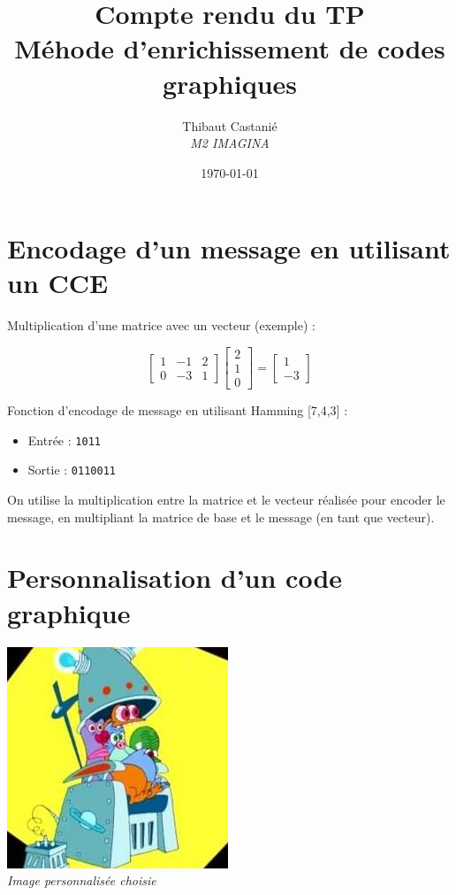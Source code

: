 \documentclass[a4paper,11pt]{article}
\begin{document}
\title{\textbf{Compte rendu du TP }\\Méhode d'enrichissement de codes graphiques}
\author{Thibaut Castanié\\\textit{M2 IMAGINA}}
\date{\today}

\maketitle
\thispagestyle{empty}

\newpage 

\section*{Encodage d'un message en utilisant un CCE}

Multiplication d'une matrice avec un vecteur (exemple) :

\[\begin{bmatrix}1 & -1 & 2\\0&-3&1\end{bmatrix}\begin{bmatrix}2\\1\\0 \end{bmatrix} = \begin{bmatrix}1 \\-3 \end{bmatrix}\]

Fonction d'encodage de message en utilisant Hamming [7,4,3] :

\begin{itemize}
\item Entrée : \texttt{1011}
\item Sortie : \texttt{0110011}
\end{itemize}
On utilise la multiplication entre la matrice et le vecteur réalisée pour encoder le message, en multipliant la matrice de base et le message (en tant que vecteur).

\newpage

\section*{Personnalisation d'un code graphique}

\begin{center}
\includegraphics[scale=1]{zinzins.jpg}\\
\textit{Image personnalisée choisie}
\end{center}
\end{document}
